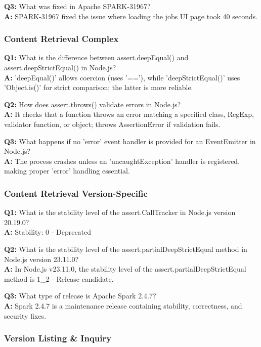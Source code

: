 \textbf{Q3:} What was fixed in Apache SPARK-31967?\\
\textbf{A:} SPARK-31967 fixed the issue where loading the jobs UI page took 40 seconds.

\subsubsection{Content Retrieval Complex}

\textbf{Q1:} What is the difference between assert.deepEqual() and assert.deepStrictEqual() in Node.js?\\
\textbf{A:} 'deepEqual()' allows coercion (uses '=='), while 'deepStrictEqual()' uses 'Object.is()' for strict comparison; the latter is more reliable.

\textbf{Q2:} How does assert.throws() validate errors in Node.js?\\
\textbf{A:} It checks that a function throws an error matching a specified class, RegExp, validator function, or object; throws AssertionError if validation fails.

\textbf{Q3:} What happens if no 'error' event handler is provided for an EventEmitter in Node.js?\\
\textbf{A:} The process crashes unless an 'uncaughtException' handler is registered, making proper 'error' handling essential.

\subsubsection{Content Retrieval Version-Specific}

\textbf{Q1:} What is the stability level of the assert.CallTracker in Node.js version 20.19.0?\\
\textbf{A:} Stability: 0 - Deprecated

\textbf{Q2:} What is the stability level of the assert.partialDeepStrictEqual method in Node.js version 23.11.0?\\
\textbf{A:} In Node.js v23.11.0, the stability level of the assert.partialDeepStrictEqual method is 1\_2 - Release candidate.

\textbf{Q3:} What type of release is Apache Spark 2.4.7?\\
\textbf{A:} Spark 2.4.7 is a maintenance release containing stability, correctness, and security fixes.

\subsubsection{Version Listing \& Inquiry}

